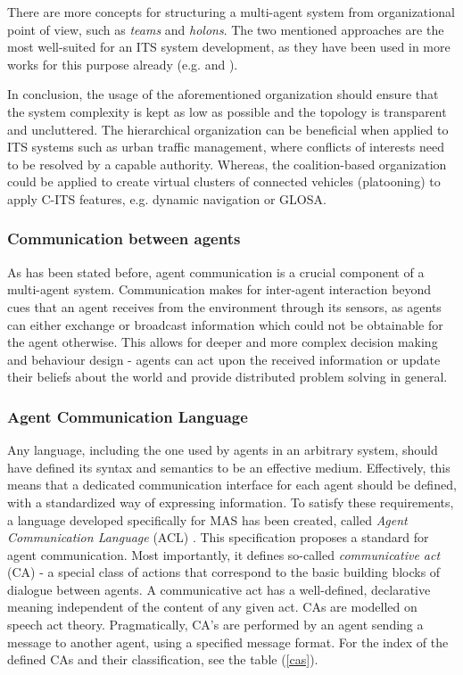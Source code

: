 \documentclass[main.tex]{subfiles}
\begin{document}
There are more concepts for structuring a multi-agent system from organizational point of view, 
such as \emph{teams} and \emph{holons}. The two mentioned approaches are the most well-suited for 
an ITS system development, as they have been used in more works for this purpose already 
(e.g. \cite{Balaji2007} and \cite{Vijsel2004}). 

In conclusion, the usage of the aforementioned organization should ensure that the system complexity 
is kept as low as possible and the topology is transparent and uncluttered. The hierarchical 
organization can be beneficial when applied to ITS systems such as urban traffic management, where 
conflicts of interests need to be resolved by a capable authority. Whereas, the coalition-based 
organization could be applied to create virtual clusters of connected vehicles (platooning) to apply 
C-ITS features, e.g. dynamic navigation or GLOSA.

\subsubsection{Communication between agents}

As has been stated before, agent communication is a crucial component of a multi-agent system. 
Communication makes for inter-agent interaction beyond cues that an agent receives from the environment 
through its sensors, as agents can either exchange or broadcast information which could not be obtainable 
for the agent otherwise. This allows for deeper and more complex decision making and behaviour design - 
agents can act upon the received information or update their beliefs about the world and provide 
distributed problem solving in general. 

\subsubsection{Agent Communication Language}\label{sec-acl}

Any language, including the one used by agents in an arbitrary system, should have defined its syntax and 
semantics to be an effective medium. Effectively, this means that a dedicated communication
interface for each agent should be defined, with a standardized way of expressing information. 
To satisfy these requirements, a language developed specifically for MAS has been created, 
called \emph{Agent Communication Language} (ACL) \cite{IntelligentPhysicalAgents2001}. 
This specification proposes a standard for agent communication. Most importantly, it defines 
so-called \emph{communicative act} (CA) - a special class of actions that correspond to the basic
building blocks of dialogue between agents. A communicative act has a well-defined, declarative
meaning independent of the content of any given act. CAs are modelled on speech act theory.
Pragmatically, CA's are performed by an agent sending a message to another agent, using a
specified message format. For the index of the defined CAs and their classification, see the
table (\ref{cas}).
\end{document}
